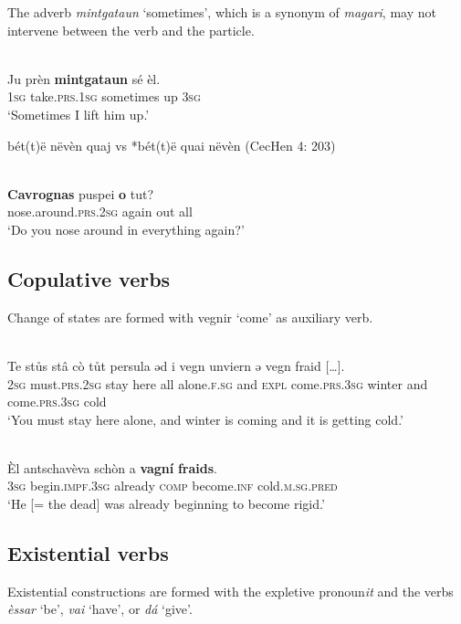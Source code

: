 The adverb \textit{mintgataun} `sometimes', which is a synonym of \textit{magari}, may not intervene between the verb and the particle.%

\ea\label{}
\\
\gll   *Ju prèn \textbf{mintgataun} sé èl. \\
     \textsc{1sg} take.\textsc{prs.1sg} sometimes up \textsc{3sg}\\
\glt `Sometimes I lift him up.'
\z




bét(t)ë nëvèn quaj vs *bét(t)ë quai nëvèn (CecHen 4: 203)

\ea\label{}
\\
\gll  \textbf{Cavrognas} puspei \textbf{o} tut? \\
    nose.around.\textsc{prs.2sg} again out all\\
\glt `Do you nose around in everything again?'
\z


\subsection{Copulative verbs}

Change of states are formed with vegnir ‘come’ as auxiliary verb.

\ea\label{}
 {\citealt[145]{Büchli1966}}\\
\gll    Te stůs stâ cò tůt persula ǝd i vegn unviern ǝ vegn fraid […].\\
    \textsc{2sg} must.\textsc{prs.2sg} stay here all alone.\textsc{f.sg} and \textsc{expl} come.\textsc{prs.3sg} winter and come.\textsc{prs.3sg} cold  \\
\glt `You must stay here alone, and winter is coming and it is getting cold.'
\z

\ea\label{}
\\
\gll  Èl antschavèva schòn a \textbf{vagní} \textbf{fraids}.\\
     \textsc{3sg} begin.\textsc{impf.3sg} already \textsc{comp}  become.\textsc{inf} cold.\textsc{m.sg.pred}\\
\glt `He [= the dead] was already beginning to become rigid.'
\z


\subsection{Existential verbs}
Existential constructions are formed with the expletive pronoun\textit{it} and the verbs \textit{èssar} `be', \textit{vai} `have', or \textit{dá} `give'.

